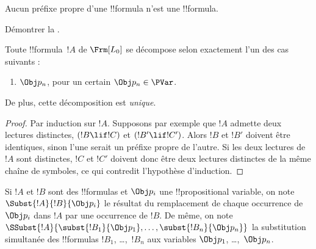 \documentclass[11pt,a4paper,openany]{memoir}
\begin{document}
\begin{prop}
Aucun préfixe propre d'une !!{formula} n'est une !!{formula}.
\end{prop}

\begin{prob}
  Démontrer la .
\end{prob}

\begin{prop}
Toute !!{formula}~$!A$ de $\Frm[L_0]$ se décompose selon exactement
l'un des cas suivants :
\begin{enumerate}


\item $\Obj p_n$, pour un certain $\Obj p_n \in \PVar$.





\end{enumerate}
De plus, cette décomposition est \emph{unique}.
\end{prop}

\begin{proof}
Par induction sur $!A$. Supposons par exemple que $!A$ admette deux
lectures distinctes, $(!B \lif !C)$ et $(!B' \lif !C')$. Alors $!B$
et $!B'$ doivent être identiques, sinon l'une serait un préfixe propre
de l'autre. Si les deux lectures de $!A$ sont distinctes, $!C$ et $!C'$
doivent donc être deux lectures distinctes de la même chaîne de
symboles, ce qui contredit l'hypothèse d'induction.
\end{proof}

\begin{defn}
Si $!A$ et $!B$ sont des !!{formula}s et $\Obj p_i$ une
!!{propositional variable}, on note $\Subst{!A}{!B}{\Obj p_i}$ le
résultat du remplacement de chaque occurrence de $\Obj p_i$ dans $!A$
par une occurrence de $!B$. De même, on note
$\SSubst{!A}{\subst{!B_1}{\Obj p_1},\dots,\subst{!B_n}{\Obj p_n}}$
la substitution simultanée des !!{formula}s $!B_1$, \dots,~$!B_n$
aux variables $\Obj p_1$, \dots,~$\Obj p_n$.
\end{defn}
\end{document}
